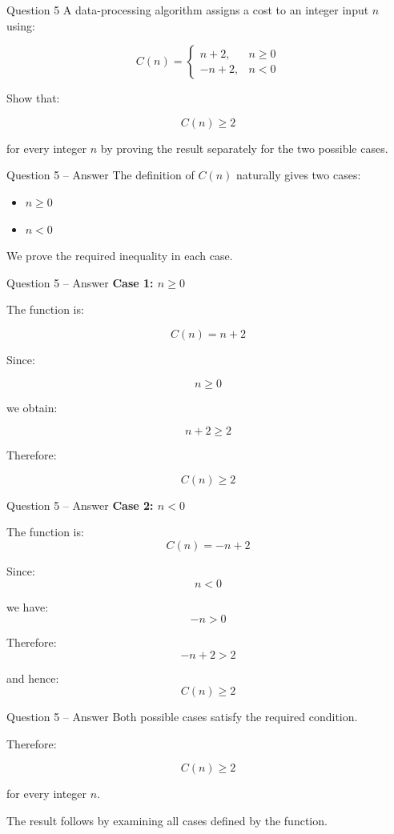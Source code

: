 
\begin{frame}{Question 5}
A data-processing algorithm assigns a cost to an integer input $n$ using:

$$
C(n)=
\begin{cases}
n+2, & n\geq0\\
-n+2, & n<0
\end{cases}
$$

Show that:

$$
C(n)\geq2
$$

for every integer $n$ by proving the result separately for the two
possible cases.
\end{frame}

\begin{frame}{Question 5 -- Answer}
The definition of $C(n)$ naturally gives two cases:

\begin{itemize}
\item $n\geq0$
\item $n<0$
\end{itemize}

We prove the required inequality in each case.
\end{frame}

\begin{frame}{Question 5 -- Answer}
\textbf{Case 1: $n\geq0$}

The function is:

$$
C(n)=n+2
$$

Since:

$$
n\geq0
$$

we obtain:

$$
n+2\geq2
$$

Therefore:

$$
C(n)\geq2
$$

\end{frame}

\begin{frame}{Question 5 -- Answer}
\textbf{Case 2: $n<0$}

The function is:
$$
C(n)=-n+2
$$

Since:
$$
n<0
$$

we have:
$$
-n>0
$$

Therefore:
$$
-n+2>2
$$

and hence:
$$
C(n)\geq2
$$

\end{frame}

\begin{frame}{Question 5 -- Answer}
Both possible cases satisfy the required condition.

Therefore:

$$
\boxed{C(n)\geq2}
$$

for every integer $n$.

The result follows by examining all cases defined by the function.
\end{frame}
